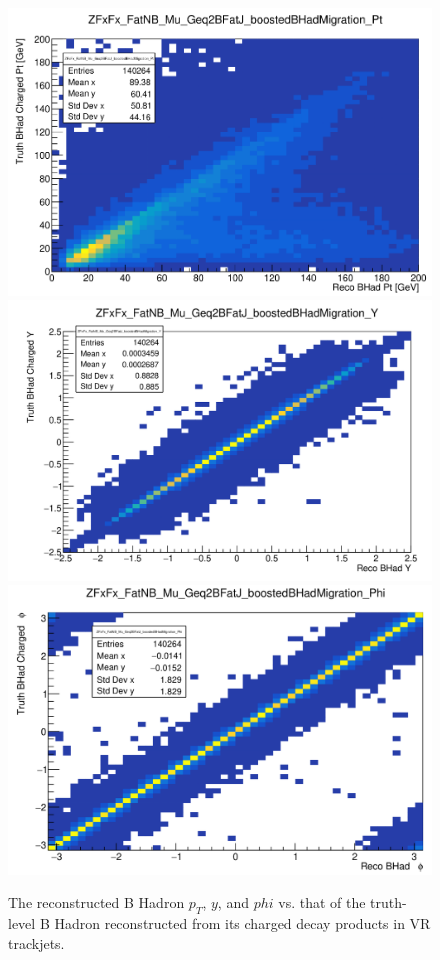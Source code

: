 \documentclass[10pt,a4paper]{book}
\begin{document}
\begin{figure}
    \centering
    \includegraphics[width=0.9\linewidth]{analysis-chapter/bhadMig_boost_pt.png}
    \includegraphics[width=0.9\linewidth]{analysis-chapter/bhadMig_boost_y.png}
    \includegraphics[width=0.9\linewidth]{analysis-chapter/bhadMig_boost_phi.png}
    \caption{The reconstructed B Hadron $p_T$, $y$, and $phi$ vs. that of the truth-level B Hadron reconstructed from its charged decay products in VR trackjets.}
    \label{boostedMigration}
\end{figure}
\end{document}
